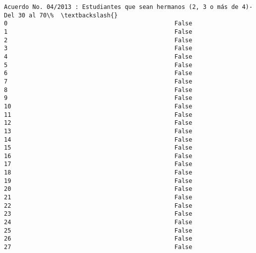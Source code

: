 \documentclass[11pt]{article}
\begin{document}
\begin{Verbatim}[commandchars=\\\{\}]
    Acuerdo No. 04/2013 : Estudiantes que sean hermanos (2, 3 o más de 4)-Del 30 al 70\%  \textbackslash{}
0                                               False                                     
1                                               False                                     
2                                               False                                     
3                                               False                                     
4                                               False                                     
5                                               False                                     
6                                               False                                     
7                                               False                                     
8                                               False                                     
9                                               False                                     
10                                              False                                     
11                                              False                                     
12                                              False                                     
13                                              False                                     
14                                              False                                     
15                                              False                                     
16                                              False                                     
17                                              False                                     
18                                              False                                     
19                                              False                                     
20                                              False                                     
21                                              False                                     
22                                              False                                     
23                                              False                                     
24                                              False                                     
25                                              False                                     
26                                              False                                     
27                                              False                                     

\end{Verbatim}
\end{document}
